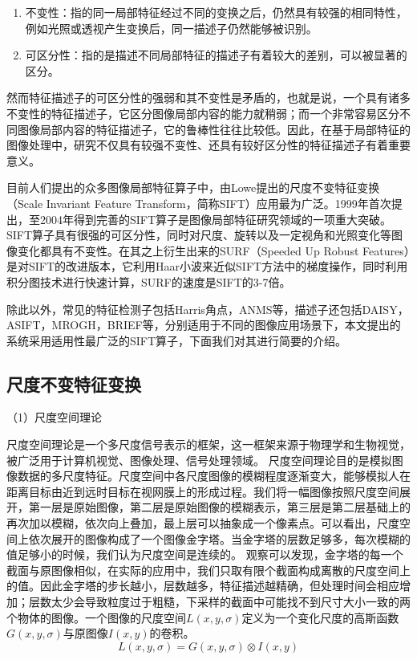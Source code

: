 \begin{enumerate}
\item 不变性：指的同一局部特征经过不同的变换之后，仍然具有较强的相同特性，例如光照或透视产生变换后，同一描述子仍然能够被识别。
\item 可区分性：指的是描述不同局部特征的描述子有着较大的差别，可以被显著的区分。
\end{enumerate}

然而特征描述子的可区分性的强弱和其不变性是矛盾的，也就是说，一个具有诸多不变性的特征描述子，它区分图像局部内容的能力就稍弱；而一个非常容易区分不同图像局部内容的特征描述子，它的鲁棒性往往比较低。因此，在基于局部特征的图像处理中，研究不仅具有较强不变性、还具有较好区分性的特征描述子有着重要意义。

目前人们提出的众多图像局部特征算子中，由Lowe提出的尺度不变特征变换（Scale Invariant Feature Transform，简称SIFT）应用最为广泛。1999年首次提出，至2004年得到完善\cite{Lowe:2004uq}的SIFT算子是图像局部特征研究领域的一项重大突破。SIFT算子具有很强的可区分性，同时对尺度、旋转以及一定视角和光照变化等图像变化都具有不变性。在其之上衍生出来的SURF（Speeded Up Robust Features）是对SIFT的改进版本，它利用Haar小波来近似SIFT方法中的梯度操作，同时利用积分图技术进行快速计算，SURF的速度是SIFT的3-7倍。

除此以外，常见的特征检测子包括Harris角点，ANMS等，描述子还包括DAISY，ASIFT，MROGH，BRIEF等，分别适用于不同的图像应用场景下，本文提出的系统采用适用性最广泛的SIFT算子，下面我们对其进行简要的介绍。

\subsection{尺度不变特征变换}

（1）尺度空间理论

尺度空间理论是一个多尺度信号表示的框架，这一框架来源于物理学和生物视觉，被广泛用于计算机视觉、图像处理、信号处理领域。
尺度空间理论目的是模拟图像数据的多尺度特征。尺度空间中各尺度图像的模糊程度逐渐变大，能够模拟人在距离目标由近到远时目标在视网膜上的形成过程。我们将一幅图像按照尺度空间展开，第一层是原始图像，第二层是原始图像的模糊表示，第三层是第二层基础上的再次加以模糊，依次向上叠加，最上层可以抽象成一个像素点。可以看出，尺度空间上依次展开的图像构成了一个图像金字塔。当金字塔的层数足够多，每次模糊的值足够小的时候，我们认为尺度空间是连续的。
观察可以发现，金字塔的每一个截面与原图像相似，在实际的应用中，我们只取有限个截面构成离散的尺度空间上的值。因此金字塔的步长越小，层数越多，特征描述越精确，但处理时间会相应增加；层数太少会导致粒度过于粗糙，下采样的截面中可能找不到尺寸大小一致的两个物体的图像。一个图像的尺度空间\(L(x,y,\sigma)\)定义为一个变化尺度的高斯函数\(G(x,y,\sigma)\)与原图像\(I(x,y)\)的卷积。
\begin{equation}
  L(x,y,\sigma) = G(x,y,\sigma) \otimes I(x,y)
\end{equation}

